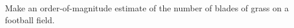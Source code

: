         Make an order-of-magnitude estimate of the number of blades of grass on a
        football field.

